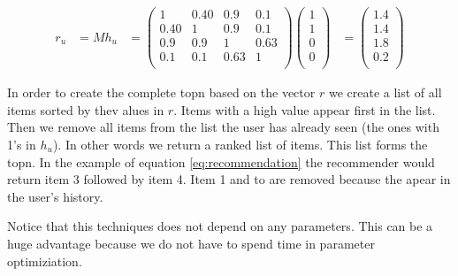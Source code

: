 \begin{align}
  \label{eq:recommendation}
r_u &= M h_u 
&=
\begin{pmatrix}
  1  & 0.40 & 0.9 & 0.1 \\
 0.40 &1  & 0.9 & 0.1 \\
  0.9 & 0.9 &1  & 0.63 \\
  0.1 & 0.1 & 0.63 &1 \\  
\end{pmatrix} 
\begin{pmatrix}
 1 \\
 1 \\
 0 \\
 0 \\
\end{pmatrix}
&= 
\begin{pmatrix}
 1.4 \\
 1.4 \\
 1.8 \\
 0.2 \\
\end{pmatrix}
\end{align}

In order to create the complete \gls{topn} based on the vector $r$ we create a list of all items sorted by thev alues in $r$. Items with a high value appear first in the list. Then we remove all items from the list the user has already seen (the ones with 1's in $h_u$). In other words we return a ranked list of items. This list forms the \gls{topn}. In the example of equation \ref{eq:recommendation} the recommender would return item 3 followed by item 4. Item 1 and to are removed because the apear in the user's history.

Notice that this techniques does not depend on any parameters. This can be a huge advantage because we do not have to spend time in parameter optimiziation.